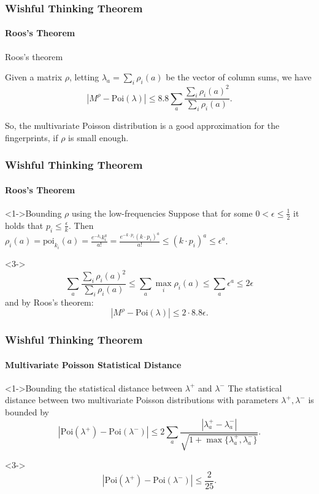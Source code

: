 \documentclass{beamer}
\newcommand{\eps}{\epsilon} \newcommand{\lam}{\lambda}
\begin{document}
\begin{frame}
  \frametitle{Wishful Thinking Theorem} \framesubtitle{Roos's Theorem}
  \begin{block}{Roos's theorem}
    
    Given a matrix $\rho$, letting $\lambda_a=\sum_i\rho_i(a)$ be the
    vector of column sums, we have
    \begin{equation*}
      |M^\rho-\mbox{Poi}(\lambda)|\le
      8.8\sum_a\frac{\sum_i\rho_i(a)^2}{\sum_i \rho_i(a)}.
    \end{equation*}
  \end{block}
  So, the multivariate Poisson distribution is a good approximation
  for the fingerprints, if $\rho$ is small enough.
\end{frame}
\begin{frame}
  \frametitle{Wishful Thinking Theorem} \framesubtitle{Roos's Theorem}

  \begin{block}<1->{Bounding $\rho$ using the low-frequencies}
    Suppose that for some $0<\eps\le\frac{1}{2}$ it holds that $p_i\le
    \frac{\eps}{k}$. Then
    $\rho_i(a)=\mbox{poi}_{k_i}(a)=\frac{e^{-k_i}k_i^a}{a!}=\frac{e^{-k\cdot
        p_i}(k\cdot p_i)^a}{a!}\le (k\cdot p_i) ^a\le \eps^a$.
  \end{block}

  \begin{block}<3->{}
    \begin{equation*}
      \sum_a\frac{\sum_i\rho_i(a)^2}{\sum_i \rho_i(a)}\le \sum_a\max_i \rho_i(a)\le \sum_a \eps^a\le 2\eps
    \end{equation*}
    and by Roos's theorem:
    \begin{equation*}
      |M^\rho-\mbox{Poi}(\lambda)|\le 2\cdot 8.8\eps.       
    \end{equation*}
  \end{block}
\end{frame}


\begin{frame}
  \frametitle{Wishful Thinking Theorem} \framesubtitle{Multivariate
    Poisson Statistical Distance}  
    \begin{block}<1->{Bounding the statistical distance between $\lambda^+$ and $\lambda^-$}
      The statistical distance between two multivariate Poisson
      distributions with parameters $\lambda^+, \lambda^-$ is bounded
      by
      \begin{equation*}
        |\mbox{Poi}(\lambda^+)-\mbox{Poi}(\lambda^-)|\le 2\sum_a\frac{|\lambda^+_a-\lambda^-_a|}{\sqrt{1+\max\{\lambda^+_a,\lambda_a^-\}}}.
      \end{equation*}
    \end{block}
    \begin{block}<3->{}
      \begin{equation*}
        |\mbox{Poi}(\lambda^+)-\mbox{Poi}(\lambda^-)|\le \frac{2}{25}.
      \end{equation*}
    \end{block}
\end{frame}
\end{document}

